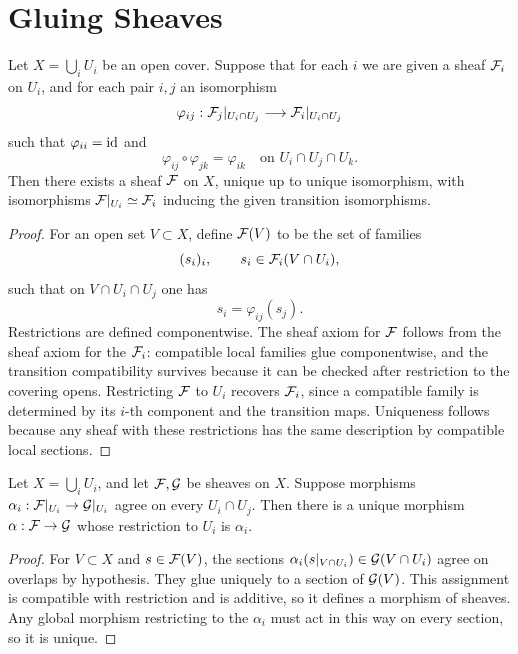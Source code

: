 \section{Gluing Sheaves}

\begin{proposition}
Let \(X=\bigcup_i U_i\) be an open cover.  Suppose that for each \(i\) we are
given a sheaf \(\mathcal{F}_i\) on \(U_i\), and for each pair \(i,j\) an isomorphism
\[
    \varphi_{ij}:\mathcal{F}_j|_{U_i\cap U_j}\longrightarrow
    \mathcal{F}_i|_{U_i\cap U_j}
\]
such that \(\varphi_{ii}=\operatorname{id}\) and
\[
    \varphi_{ij}\circ\varphi_{jk}=\varphi_{ik}
    \quad\text{on }U_i\cap U_j\cap U_k.
\]
Then there exists a sheaf \(\mathcal{F}\) on \(X\), unique up to unique isomorphism,
with isomorphisms \(\mathcal{F}|_{U_i}\simeq\mathcal{F}_i\) inducing the given transition
isomorphisms.
\end{proposition}

\begin{proof}
For an open set \(V\subset X\), define \(\mathcal{F}(V)\) to be the set of families
\[
    (s_i)_i,\qquad s_i\in\mathcal{F}_i(V\cap U_i),
\]
such that on \(V\cap U_i\cap U_j\) one has
\[
    s_i=\varphi_{ij}(s_j).
\]
Restrictions are defined componentwise.  The sheaf axiom for \(\mathcal{F}\) follows
from the sheaf axiom for the \(\mathcal{F}_i\): compatible local families glue
componentwise, and the transition compatibility survives because it can be
checked after restriction to the covering opens.  Restricting \(\mathcal{F}\) to
\(U_i\) recovers \(\mathcal{F}_i\), since a compatible family is determined by its
\(i\)-th component and the transition maps.  Uniqueness follows because any
sheaf with these restrictions has the same description by compatible local
sections.
\end{proof}

\begin{proposition}
Let \(X=\bigcup_i U_i\), and let \(\mathcal{F},\mathcal{G}\) be sheaves on \(X\).  Suppose
morphisms \(\alpha_i:\mathcal{F}|_{U_i}\to\mathcal{G}|_{U_i}\) agree on every
\(U_i\cap U_j\).  Then there is a unique morphism
\(\alpha:\mathcal{F}\to\mathcal{G}\) whose restriction to \(U_i\) is \(\alpha_i\).
\end{proposition}

\begin{proof}
For \(V\subset X\) and \(s\in\mathcal{F}(V)\), the sections
\(\alpha_i(s|_{V\cap U_i})\in\mathcal{G}(V\cap U_i)\) agree on overlaps by hypothesis.
They glue uniquely to a section of \(\mathcal{G}(V)\).  This assignment is compatible
with restriction and is additive, so it defines a morphism of sheaves.  Any
global morphism restricting to the \(\alpha_i\) must act in this way on every
section, so it is unique.
\end{proof}

